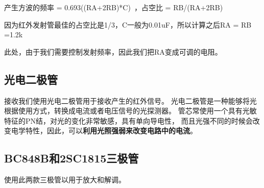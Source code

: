 产生方波的频率 = 0.693((RA+2RB)*C) ，占空比 = RB/(RA+2RB)


因为红外发射管最佳的占空比是1/3，C一般为0.01uF，所以计算之后RA = RB =1.2k

此处，由于我们需要控制发射频率，因此我们把RA变成可调的电阻。

\subsection{光电二极管}
接收我们使用光电二极管用于接收产生的红外信号。
光电二极管是一种能够将光根据使用方式，转换成电流或者电压信号的光探测器。
管芯常使用一个具有光敏特征的PN结，对光的变化非常敏感，具有单向导电性，
而且光强不同的时候会改变电学特性，因此，可以\textbf{利用光照强弱来改变电路中的电流}。

\subsection{BC848B和2SC1815三极管}
使用此两款三极管以用于放大和解调。
